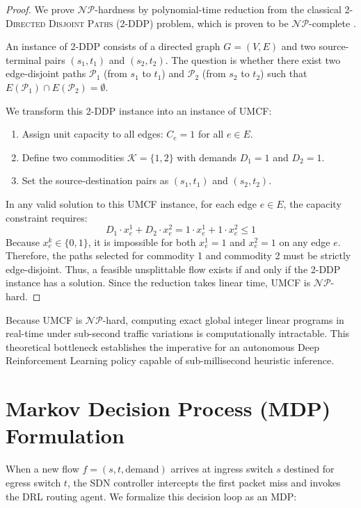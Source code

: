 \documentclass[12pt,a4paper,oneside]{report}
\begin{document}
\begin{proof}
We prove $\mathcal{NP}$-hardness by polynomial-time reduction from the classical \textsc{2-Directed Disjoint Paths (2-DDP)} problem, which is proven to be $\mathcal{NP}$-complete \cite{garey1979computers}.

An instance of 2-DDP consists of a directed graph $G = (V, E)$ and two source-terminal pairs $(s_1, t_1)$ and $(s_2, t_2)$. The question is whether there exist two edge-disjoint paths $\mathcal{P}_1$ (from $s_1$ to $t_1$) and $\mathcal{P}_2$ (from $s_2$ to $t_2$) such that $E(\mathcal{P}_1) \cap E(\mathcal{P}_2) = \emptyset$.

We transform this 2-DDP instance into an instance of UMCF:
\begin{enumerate}
    \item Assign unit capacity to all edges: $C_e = 1$ for all $e \in E$.
    \item Define two commodities $\mathcal{K} = \{1, 2\}$ with demands $D_1 = 1$ and $D_2 = 1$.
    \item Set the source-destination pairs as $(s_1, t_1)$ and $(s_2, t_2)$.
\end{enumerate}
In any valid solution to this UMCF instance, for each edge $e \in E$, the capacity constraint requires:
\begin{equation}
    D_1 \cdot x_e^1 + D_2 \cdot x_e^2 = 1 \cdot x_e^1 + 1 \cdot x_e^2 \le 1
\end{equation}
Because $x_e^k \in \{0, 1\}$, it is impossible for both $x_e^1 = 1$ and $x_e^2 = 1$ on any edge $e$. Therefore, the paths selected for commodity 1 and commodity 2 must be strictly edge-disjoint. Thus, a feasible unsplittable flow exists if and only if the 2-DDP instance has a solution. Since the reduction takes linear time, UMCF is $\mathcal{NP}$-hard.
\end{proof}

Because UMCF is $\mathcal{NP}$-hard, computing exact global integer linear programs in real-time under sub-second traffic variations is computationally intractable. This theoretical bottleneck establishes the imperative for an autonomous Deep Reinforcement Learning policy capable of sub-millisecond heuristic inference.

\section{Markov Decision Process (MDP) Formulation}
When a new flow $f = (s, t, \text{demand})$ arrives at ingress switch $s$ destined for egress switch $t$, the SDN controller intercepts the first packet miss and invokes the DRL routing agent. We formalize this decision loop as an MDP:
\end{document}
